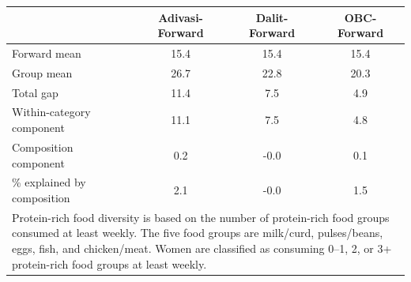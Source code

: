 \begin{tabular}{l*{3}{c}}
\hline\hline
            &\multicolumn{1}{c}{Adivasi-Forward}&\multicolumn{1}{c}{Dalit-Forward}&\multicolumn{1}{c}{OBC-Forward}\\
\hline
\hline
Forward mean&        15.4&        15.4&        15.4\\
Group mean  &        26.7&        22.8&        20.3\\
Total gap   &        11.4&         7.5&         4.9\\
Within-category component&        11.1&         7.5&         4.8\\
Composition component&         0.2&        -0.0&         0.1\\
\% explained by composition&         2.1&        -0.0&         1.5\\
\hline\hline
\multicolumn{4}{l}{\footnotesize \parbox[t]{0.95\linewidth}{Protein-rich food diversity is based on the number of protein-rich food groups consumed at least weekly. The five food groups are milk/curd, pulses/beans, eggs, fish, and chicken/meat. Women are classified as consuming 0–1, 2, or 3+ protein-rich food groups at least weekly.}}\\
\end{tabular}

